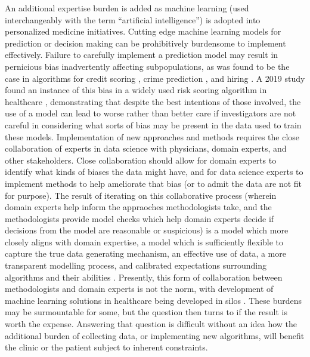 An additional expertise burden is added as machine learning (used interchangeably with the term “artificial intelligence”) is adopted into personalized medicine initiatives.  Cutting edge machine learning models for prediction or decision making can be prohibitively burdensome to implement effectively. Failure to carefully implement a prediction model may result in pernicious bias inadvertently affecting subpopulations, as was found to be the case in algorithms for credit scoring \cite{barocas2016big}, crime prediction \cite{lum2016predict}, and hiring \cite{ajunwa2020paradox}.  A 2019 study found an instance of this bias in a widely used risk scoring algorithm in healthcare \cite{obermeyer2019dissecting}, demonstrating that despite the best intentions of those involved, the use of a model can lead to worse rather than better care if investigators are not careful in considering what sorts of bias may be present in the data used to train these models.  Implementation of new approaches and methods requires the close collaboration of experts in data science  with physicians, domain experts, and other stakeholders.  Close collaboration should allow for domain experts to identify what kinds of biases the data might have, and for data science experts to implement methods to help ameliorate that bias (or to admit the data are not fit for purpose).  The result of iterating on this collaborative process (wherein domain experts help inform the appraoches methodologists take, and the methodologists provide model checks which help domain experts decide if decisions from the model are reasonable or suspicious) is a model which more closely aligns with domain expertise, a model which is sufficiently flexible to capture the true data generating mechanism, an effective use of data, a more transparent modelling process, and calibrated expectations surrounding algorithms and their abilities \cite{frohlich2018hype}.  Presently, this form of collaboration between methodologists and domain experts is not the norm, with development of machine learning solutions in healthcare being developed in silos \cite{wiens2019no}.  These burdens may be surmountable for some, but the question then turns to if the result is worth the expense.   Answering that question is difficult without an idea how the additional burden of collecting data, or implementing new algorithms, will benefit the clinic or the patient subject to inherent constraints. 



